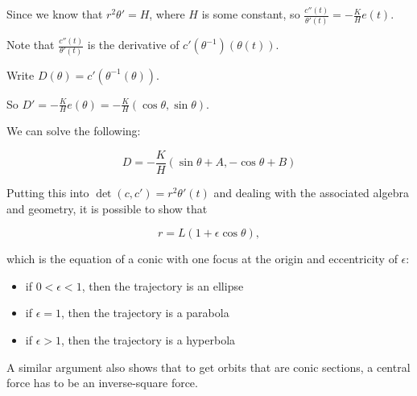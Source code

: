 \documentclass[11pt]{scrartcl}
\begin{document}
Since we know that $r^2\theta' = H$, where $H$ is some constant, so $\frac{c''(t)}{\theta'(t)} = - \frac{K}{H}e(t)$.

Note that $\frac{c''(t)}{\theta'(t)}$ is the derivative of $c'(\theta^{-1})(\theta(t))$.

Write $D(\theta) = c'(\theta^{-1}(\theta))$.

So $D' = - \frac{K}{H}e(\theta) = -\frac{K}{H}(\cos \theta, \sin \theta)$.

We can solve the following:

\begin{equation*}
D = - \frac{K}{H}(\sin \theta +A, -\cos \theta +B)
\end{equation*}

Putting this into $\det(c, c') = r^2\theta'(t)$ and dealing with the associated algebra and geometry, it is possible to show that

\begin{equation*}
r = L(1+\epsilon \cos\theta),
\end{equation*}

which is the equation of a conic with one focus at the origin and eccentricity of $\epsilon$:
\begin{itemize}
\item if $0<\epsilon< 1$, then the trajectory is an ellipse
\item if $\epsilon = 1$, then the trajectory is a parabola
\item if $\epsilon > 1$, then the trajectory is a hyperbola
\end{itemize}

A similar argument also shows that to get orbits that are conic
sections, a central force has to be an inverse-square force.
\end{document}
